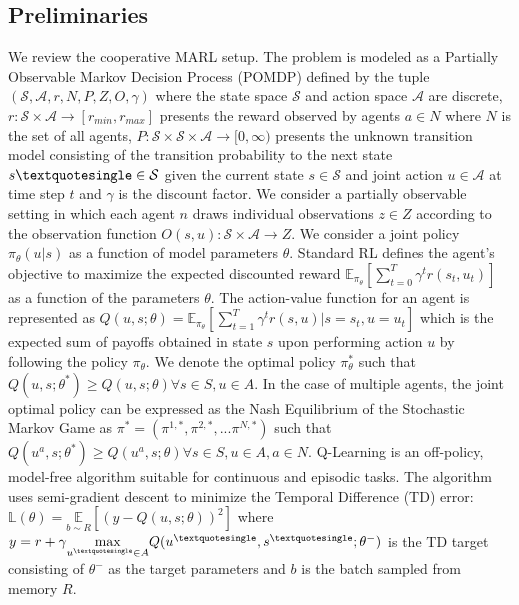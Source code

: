 \documentclass{article}
\begin{document}
\begin{multicols}{2}
\subsection{Preliminaries}
We review the cooperative MARL setup. The problem is modeled as a Partially Observable Markov Decision Process (POMDP) \cite{rl} defined by the tuple $(\mathcal{S},\mathcal{A},r,N,P,Z,O,\gamma)$ where the state space $\mathcal{S}$ and action space $\mathcal{A}$ are discrete, $r: \mathcal{S} \times \mathcal{A} \rightarrow [r_{min},r_{max}]$ presents the reward observed by agents $a \in N$ where $N$ is the set of all agents, $P: \mathcal{S} \times \mathcal{S} \times \mathcal{A} \rightarrow [0,\infty)$ presents the unknown transition model consisting of the transition probability to the next state $s\textquotesingle \in \mathcal{S}$ given the current state $s \in \mathcal{S}$ and joint action $u \in \mathcal{A}$ at time step $t$ and $\gamma$ is the discount factor. We consider a partially observable setting in which each agent $n$ draws individual observations $z \in Z$ according to the observation function $O(s,u): \mathcal{S} \times \mathcal{A} \rightarrow Z$. We consider a joint policy $\pi_{\theta}({u|s})$ as a function of model parameters $\theta$. Standard RL defines the agent's objective to maximize the expected discounted reward $\mathbb{E}_{\pi_{\theta}}[\sum_{t=0}^{T}\gamma^{t}r(s_{t},u_{t})]$ as a function of the parameters $\theta$. The action-value function for an agent is represented as $Q(u,s;\theta) = \mathbb{E}_{\pi_{\theta}}[\sum_{t=1}^{T}\gamma^{t}r(s,u)|s=s_{t},u=u_{t}]$ which is the expected sum of payoffs obtained in state $s$ upon performing action $u$ by following the policy $\pi_{\theta}$. We denote the optimal policy $\pi_{\theta}^{*}$ such that $Q(u,s;\theta^{*}) \geq Q(u,s;\theta) \forall s \in S, u \in A$. In the case of multiple agents, the joint optimal policy can be expressed as the Nash Equilibrium \cite{nash} of the Stochastic Markov Game as $\pi^{*} = (\pi^{1,*},\pi^{2,*}, ...\pi^{N,*})$ such that $Q(u^{a},s;\theta^{*}) \geq Q(u^{a},s;\theta) \forall s \in S, u \in A, a \in N$. Q-Learning is an off-policy, model-free algorithm suitable for continuous and episodic tasks. The algorithm uses semi-gradient descent to minimize the Temporal Difference (TD) error: $\mathbb{L(\theta)} = \underset{b \sim R}{\mathbb{E}}[(y - Q(u,s;\theta))^{2}]$ where $y = r + \gamma \underset{u^{\textquotesingle}\in A}{\max} Q(u^{\textquotesingle},s^{\textquotesingle};\theta^{-})$ is the TD target consisting of $\theta^{-}$ as the target parameters and $b$ is the batch sampled from memory $R$.


\end{multicols}
\end{document}

